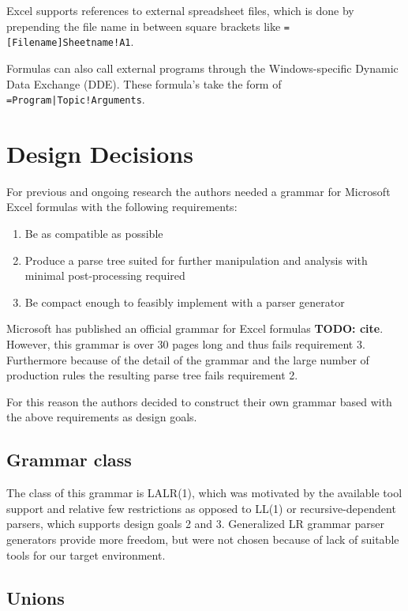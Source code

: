 \documentclass[conference]{IEEEtran}
\newcommand{\todo}[1]{\textbf{TODO: #1}}
\begin{document}
Excel supports references to external spreadsheet files, which is done by prepending the file name in between square brackets like \texttt{=[Filename]Sheetname!A1}.

Formulas can also call external programs through the Windows-specific Dynamic Data Exchange (DDE).
These formula's take the form of \texttt{=Program|Topic!Arguments}.

\section{Design Decisions}
For previous and ongoing research the authors needed a grammar for Microsoft Excel formulas with the following requirements:

\begin{enumerate}
\item Be as compatible as possible
\item Produce a parse tree suited for further manipulation and analysis with minimal post-processing required
\item Be compact enough to feasibly implement with a parser generator
\end{enumerate}

Microsoft has published an official grammar for Excel formulas \todo{cite}.
However, this grammar is over 30 pages long and thus fails requirement 3.
Furthermore because of the detail of the grammar and the large number of production rules the resulting parse tree fails requirement 2.

For this reason the authors decided to construct their own grammar based with the above requirements as design goals.

\subsection{Grammar class}

The class of this grammar is LALR(1), which was motivated by the available tool support and relative few restrictions as opposed to LL(1) or recursive-dependent parsers, which supports design goals 2 and 3.
Generalized LR grammar parser generators provide more freedom, but were not chosen because of lack of suitable tools for our target environment.

\subsection{Unions}
\label{subsec:desing:unions}
\end{document}
